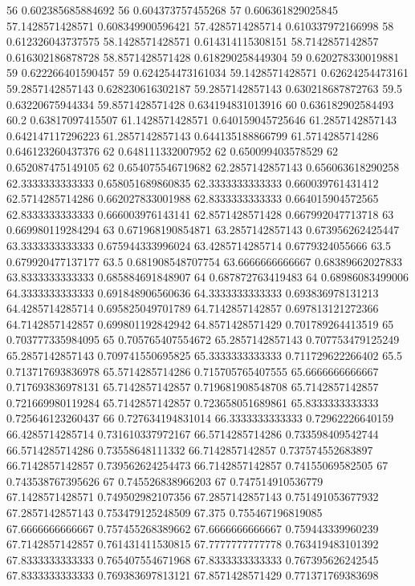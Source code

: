 {56 0.602385685884692
56 0.604373757455268
57 0.606361829025845
57.1428571428571 0.608349900596421
57.4285714285714 0.610337972166998
58 0.612326043737575
58.1428571428571 0.614314115308151
58.7142857142857 0.616302186878728
58.8571428571428 0.618290258449304
59 0.620278330019881
59 0.622266401590457
59 0.624254473161034
59.1428571428571 0.62624254473161
59.2857142857143 0.628230616302187
59.2857142857143 0.630218687872763
59.5 0.63220675944334
59.8571428571428 0.634194831013916
60 0.636182902584493
60.2 0.63817097415507
61.1428571428571 0.640159045725646
61.2857142857143 0.642147117296223
61.2857142857143 0.644135188866799
61.5714285714286 0.646123260437376
62 0.648111332007952
62 0.650099403578529
62 0.652087475149105
62 0.654075546719682
62.2857142857143 0.656063618290258
62.3333333333333 0.658051689860835
62.3333333333333 0.660039761431412
62.5714285714286 0.662027833001988
62.8333333333333 0.664015904572565
62.8333333333333 0.666003976143141
62.8571428571428 0.667992047713718
63 0.669980119284294
63 0.671968190854871
63.2857142857143 0.673956262425447
63.3333333333333 0.675944333996024
63.4285714285714 0.6779324055666
63.5 0.679920477137177
63.5 0.681908548707754
63.6666666666667 0.68389662027833
63.8333333333333 0.685884691848907
64 0.687872763419483
64 0.68986083499006
64.3333333333333 0.691848906560636
64.3333333333333 0.693836978131213
64.4285714285714 0.695825049701789
64.7142857142857 0.697813121272366
64.7142857142857 0.699801192842942
64.8571428571429 0.701789264413519
65 0.703777335984095
65 0.705765407554672
65.2857142857143 0.707753479125249
65.2857142857143 0.709741550695825
65.3333333333333 0.711729622266402
65.5 0.713717693836978
65.5714285714286 0.715705765407555
65.6666666666667 0.717693836978131
65.7142857142857 0.719681908548708
65.7142857142857 0.721669980119284
65.7142857142857 0.723658051689861
65.8333333333333 0.725646123260437
66 0.727634194831014
66.3333333333333 0.72962226640159
66.4285714285714 0.731610337972167
66.5714285714286 0.733598409542744
66.5714285714286 0.73558648111332
66.7142857142857 0.737574552683897
66.7142857142857 0.739562624254473
66.7142857142857 0.74155069582505
67 0.743538767395626
67 0.745526838966203
67 0.747514910536779
67.1428571428571 0.749502982107356
67.2857142857143 0.751491053677932
67.2857142857143 0.753479125248509
67.375 0.755467196819085
67.6666666666667 0.757455268389662
67.6666666666667 0.759443339960239
67.7142857142857 0.761431411530815
67.7777777777778 0.763419483101392
67.8333333333333 0.765407554671968
67.8333333333333 0.767395626242545
67.8333333333333 0.769383697813121
67.8571428571429 0.771371769383698
}
